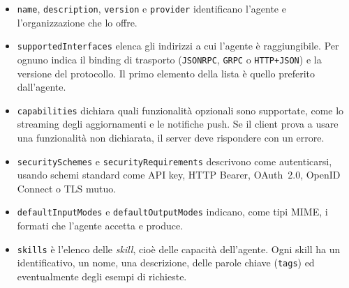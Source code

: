 \begin{itemize}
    \item \texttt{name}, \texttt{description}, \texttt{version} e \texttt{provider} identificano l'agente e l'organizzazione che lo offre.
    \item \texttt{supported\allowbreak Interfaces} elenca gli indirizzi a cui l'agente è raggiungibile. Per ognuno indica il binding di trasporto (\texttt{JSONRPC}, \texttt{GRPC} o \texttt{HTTP+JSON}) e la versione del protocollo. Il primo elemento della lista è quello preferito dall'agente.
    \item \texttt{capabilities} dichiara quali funzionalità opzionali sono supportate, come lo streaming degli aggiornamenti e le notifiche push. Se il client prova a usare una funzionalità non dichiarata, il server deve rispondere con un errore.
    \item \texttt{security\allowbreak Schemes} e \texttt{security\allowbreak Requirements} descrivono come autenticarsi, usando schemi standard come API key, HTTP Bearer, OAuth~2.0, OpenID Connect o TLS mutuo.
    \item \texttt{default\allowbreak Input\allowbreak Modes} e \texttt{default\allowbreak Output\allowbreak Modes} indicano, come tipi MIME, i formati che l'agente accetta e produce.
    \item \texttt{skills} è l'elenco delle \emph{skill}, cioè delle capacità dell'agente. Ogni skill ha un identificativo, un nome, una descrizione, delle parole chiave (\texttt{tags}) ed eventualmente degli esempi di richieste.
\end{itemize}

